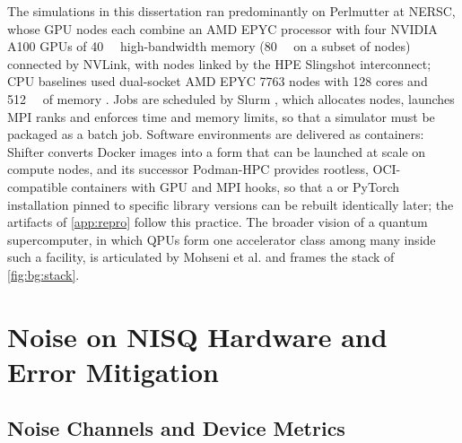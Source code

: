 The simulations in this dissertation ran predominantly on Perlmutter at NERSC, whose GPU nodes each combine an AMD EPYC processor with four NVIDIA A100 GPUs of \SI{40}{\giga\byte} high-bandwidth memory (\SI{80}{\giga\byte} on a subset of nodes) connected by NVLink, with nodes linked by the HPE Slingshot interconnect; CPU baselines used dual-socket AMD EPYC 7763 nodes with 128 cores and \SI{512}{\giga\byte} of memory \cite{guo2025qgear,choquette2021a100}. Jobs are scheduled by Slurm \cite{jette2023slurm}, which allocates nodes, launches MPI ranks and enforces time and memory limits, so that a simulator must be packaged as a batch job. Software environments are delivered as containers: Shifter \cite{gerhardt2017shifter} converts Docker images into a form that can be launched at scale on compute nodes, and its successor Podman-HPC \cite{stephey2022podman} provides rootless, OCI-compatible containers with GPU and MPI hooks, so that a \cudaq{} or PyTorch installation pinned to specific library versions can be rebuilt identically later; the artifacts of \cref{app:repro} follow this practice. The broader vision of a quantum supercomputer, in which QPUs form one accelerator class among many inside such a facility, is articulated by Mohseni et al. \cite{mohseni2024quantumsupercomputer} and frames the stack of \cref{fig:bg:stack}.

\section{Noise on NISQ Hardware and Error Mitigation}\label{sec:bg:nisq}

\subsection{Noise Channels and Device Metrics}

